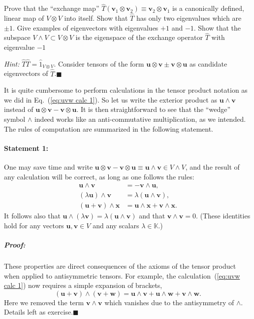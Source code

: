 Prove that the {}``exchange map'' $\hat{T}\left(\mathbf{v}_{1}\otimes\mathbf{v}_{2}\right)\equiv\mathbf{v}_{2}\otimes\mathbf{v}_{1}$
is a canonically defined, linear map of $V\otimes V$ into itself.
Show that $\hat{T}$ has only two eigenvalues which are $\pm1$. Give
examples of eigenvectors with eigenvalues $+1$ and $-1$. Show that
the subspace $V\wedge V\subset V\otimes V$ is the eigenspace of the
exchange operator $\hat{T}$ with eigenvalue $-1$

\emph{Hint:} $\hat{T}\hat{T}=\hat{1}_{V\otimes V}$. Consider tensors
of the form $\mathbf{u}\otimes\mathbf{v}\pm\mathbf{v}\otimes\mathbf{u}$
as candidate eigenvectors of $\hat{T}$.\hfill{}$\blacksquare$

It is quite cumbersome to perform calculations in the tensor product
notation as we did in Eq.~(\ref{eq:uvw calc 1}). So let us write
the exterior product as $\mathbf{u}\wedge\mathbf{v}$ instead of $\mathbf{u}\otimes\mathbf{v}-\mathbf{v}\otimes\mathbf{u}$.
It is then straightforward to see that the {}``wedge'' symbol $\wedge$
indeed works like an anti-commutative multiplication, as we intended.
The rules of computation are summarized in the following statement.


\paragraph{Statement 1:}

One may save time and write $\mathbf{u}\otimes\mathbf{v}-\mathbf{v}\otimes\mathbf{u}\equiv\mathbf{u}\wedge\mathbf{v}\in V\wedge V$,
and the result of any calculation will be correct, as long as one
follows the rules:\begin{align}
\mathbf{u}\wedge\mathbf{v} & =-\mathbf{v}\wedge\mathbf{u},\label{eq:uv antisymm}\\
\left(\lambda\mathbf{u}\right)\wedge\mathbf{v} & =\lambda\left(\mathbf{u}\wedge\mathbf{v}\right),\\
\left(\mathbf{u}+\mathbf{v}\right)\wedge\mathbf{x} & =\mathbf{u}\wedge\mathbf{x}+\mathbf{v}\wedge\mathbf{x}.\label{eq:uv distrib}\end{align}
It follows also that $\mathbf{u}\wedge\left(\lambda\mathbf{v}\right)=\lambda\left(\mathbf{u}\wedge\mathbf{v}\right)$
and that $\mathbf{v}\wedge\mathbf{v}=0$. (These identities hold for
any vectors $\mathbf{u},\mathbf{v}\in V$ and any scalars $\lambda\in\mathbb{K}$.)


\subparagraph{Proof:}

These properties are direct consequences of the axioms of the tensor
product when applied to antisymmetric tensors. For example, the calculation~(\ref{eq:uvw calc 1})
now requires a simple expansion of brackets,\[
\left(\mathbf{u}+\mathbf{v}\right)\wedge\left(\mathbf{v}+\mathbf{w}\right)=\mathbf{u}\wedge\mathbf{v}+\mathbf{u}\wedge\mathbf{w}+\mathbf{v}\wedge\mathbf{w}.\]
Here we removed the term $\mathbf{v}\wedge\mathbf{v}$ which vanishes
due to the antisymmetry of $\wedge$. Details left as exercise.\hfill{}$\blacksquare$

